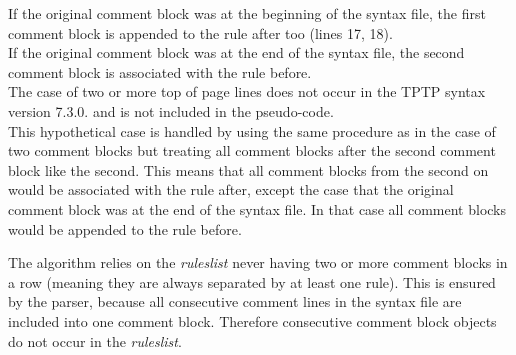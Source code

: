 If the original comment block was at the beginning of the syntax file, the first comment block is appended to the rule 
after too (lines 17, 18).\\
If the original comment block was at the end of the syntax file, the second comment block is associated with the rule before.\\
The case of two or more top of page lines does not occur in the \ac{TPTP} syntax version 7.3.0. and is not included in the pseudo-code.\\
This hypothetical case is handled by using the same procedure as in the case of two comment blocks but treating all comment blocks after the second comment block like the second. This means that all comment blocks from the second on would be associated with the rule after, except the case that the original comment block was at the end of the syntax file. In that case all comment blocks would be appended to the rule before.

The algorithm relies on the \textit{rules\textunderscore list} never having two or more comment blocks in a row (meaning they are always separated by at least one rule). This is ensured by the parser, because all consecutive comment lines in the syntax file are included into one comment block. Therefore consecutive comment block objects do not occur in the \textit{rules\textunderscore list}.

